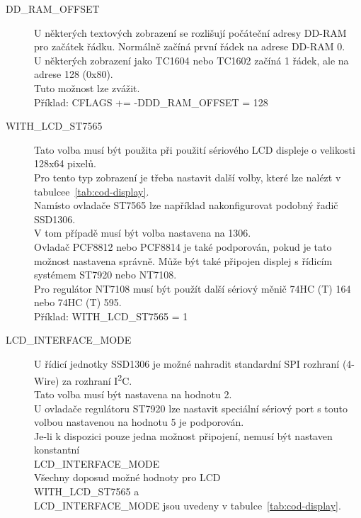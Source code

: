 \begin{description}
  \item[DD\_RAM\_OFFSET] U některých textových zobrazení se rozlišují počáteční adresy DD-RAM pro začátek řádku. Normálně začíná první řádek na adrese DD-RAM 0.\\ U některých zobrazení jako TC1604
nebo TC1602 začíná 1 řádek, ale na adrese 128 (0x80).\\
Tuto možnost lze zvážit.\\
Příklad: CFLAGS += -DDD\_RAM\_OFFSET = 128

  \item[WITH\_LCD\_ST7565] Tato volba musí být použita při použití sériového LCD displeje o velikosti 128x64 pixelů.\\
Pro tento typ zobrazení je třeba nastavit další volby, které lze nalézt v tabulcee~\ref{tab:cod-display}.
\\Namísto ovladače ST7565 lze například nakonfigurovat podobný řadič SSD1306.\\
V tom případě musí být volba nastavena na 1306.\\
Ovladač PCF8812 nebo PCF8814 je také podporován, pokud je tato možnost nastavena správně.
Může být také připojen displej s řídicím systémem ST7920 nebo NT7108.\\
Pro regulátor NT7108 musí být použít další sériový měnič 74HC (T) 164 nebo 74HC (T) 595.\\
Příklad: WITH\_LCD\_ST7565 = 1 

 \item[LCD\_INTERFACE\_MODE] U řídicí jednotky SSD1306 je možné nahradit standardní  SPI rozhraní (4-Wire) za rozhraní I\textsuperscript{2}C.\\Tato volba musí být nastavena na hodnotu 2.\\
U ovladače regulátoru ST7920 lze nastavit speciální sériový port s touto volbou nastavenou na hodnotu 5 je podporován.\\
Je-li k dispozici pouze jedna možnost připojení, nemusí být nastaven konstantní\\ LCD\_INTERFACE\_MODE \\


Všechny doposud možné hodnoty pro LCD \\ WITH\_LCD\_ST7565 a\\ LCD\_INTERFACE\_MODE jsou uvedeny v tabulce~\ref{tab:cod-display}.\\


\end{description}
